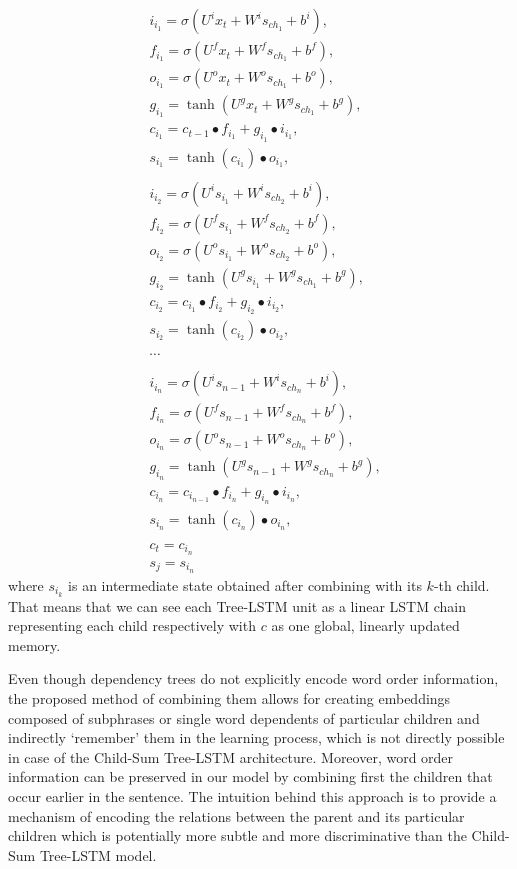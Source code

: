 \documentclass[10pt, a4paper]{article}
\begin{document}
\begin{equation}
\begin{split}
&i_{i_1} = \sigma(U^i{x_t} + W^i{s_{ch_1}} + b^i) ,\\
&f_{i_1} = \sigma(U^f{x_t} + W^f{s_{ch_1}} + b^f) ,\\
&o_{i_1} = \sigma(U^o{x_t} + W^o{s_{ch_1}} + b^o) ,\\
&g_{i_1} = \tanh(U^g{x_t}+ W^g{s_{ch_1}} + b^g) ,\\
&c_{i_1} = c_{t-1} \bullet f_{i_1} + g_{i_1} \bullet i_{i_1} ,\\
&s_{i_1} = \tanh({c_{i_1}}) \bullet o_{i_1},\\\\
&i_{i_2} = \sigma(U^is_{i_1} + W^is_{ch_2} + b^i) ,\\
&f_{i_2} = \sigma(U^fs_{i_1} + W^fs_{ch_2} + b^f) ,\\
&o_{i_2} = \sigma(U^os_{i_1} + W^os_{ch_2} + b^o) ,\\
&g_{i_2} = \tanh(U^gs_{i_1}+ W^gs_{ch_1} + b^g) ,\\
&c_{i_2} = c_{i_1} \bullet f_{i_2} + g_{i_2} \bullet i_{i_2} ,\\
&s_{i_2} = \tanh(c_{i_2}) \bullet o_{i_2},\\\\
&\cdots\\\\
&i_{i_n} = \sigma(U^is_{{n-1}} + W^is_{ch_{n}} + b^i) ,\\
&f_{i_n} = \sigma(U^fs_{{n-1}} + W^fs_{ch_{n}} + b^f) ,\\
&o_{i_n} = \sigma(U^os_{{n-1}} + W^os_{ch_{n}} + b^o) ,\\
&g_{i_n} = \tanh(U^gs_{{n-1}}+ W^gs_{ch_{n}} + b^g) ,\\
&c_{i_n} = c_{i_{n-1}} \bullet f_{i_n} + g_{i_n} \bullet i_{i_n} ,\\
&s_{i_n} = \tanh(c_{i_n}) \bullet o_{i_n},\\\\
&c_{t} = c_{i_n}\\
&s_{j} = s_{i_n}
\end{split}
\end{equation}
	where $s_{i_k}$ is an intermediate state obtained after combining with its $k$-th child. That means that we can see each Tree-LSTM unit as a linear LSTM chain representing each child respectively with $c$ as one global, linearly updated memory.
\par Even though dependency trees do not explicitly encode word order information, the proposed method of combining them allows for creating embeddings composed of subphrases or single word dependents of particular children and indirectly `remember' them in the learning process, which is not directly possible in case of the Child-Sum Tree-LSTM architecture. Moreover, word order information can be preserved in our model by combining first the children that occur earlier in the sentence. The intuition behind this approach is to provide a mechanism of encoding  the relations between the parent and its particular children which is potentially more subtle and more discriminative than the Child-Sum Tree-LSTM model.
\end{document}
